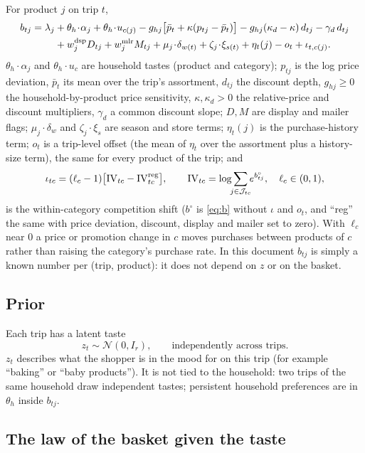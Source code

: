 \documentclass[11pt,a4paper]{article}
\theoremstyle{remark}
\newcommand{\N}{\mathcal N}
\begin{document}
For product $j$ on trip $t$,
\begin{align}
b_{tj}=\lambda_j &+\theta_h\!\cdot\!\alpha_j+\theta_h\!\cdot\!u_{c(j)}
 -g_{hj}\big[\bar p_t+\kappa(p_{tj}-\bar p_t)\big]-g_{hj}(\kappa_d-\kappa)\,d_{tj}-\gamma_d\,d_{tj}\nonumber\\
&+w^{\rm dsp}_j D_{tj}+w^{\rm mlr}_j M_{tj}+\mu_j\!\cdot\!\delta_{w(t)}+\zeta_j\!\cdot\!\xi_{s(t)}
 +\eta_t(j)-o_t+\iota_{t,c(j)} .
\label{eq:b}
\end{align}
$\theta_h\cdot\alpha_j$ and $\theta_h\cdot u_c$ are household tastes (product and category);
$p_{tj}$ is the log price deviation, $\bar p_t$ its mean over the trip's assortment, $d_{tj}$ the discount
depth, $g_{hj}\ge0$ the household-by-product price sensitivity, $\kappa,\kappa_d>0$ the relative-price and
discount multipliers, $\gamma_d$ a common discount slope; $D,M$ are display and mailer flags;
$\mu_j\cdot\delta_w$ and $\zeta_j\cdot\xi_s$ are season and store terms; $\eta_t(j)$ is the purchase-history
term; $o_t$ is a trip-level offset (the mean of $\eta_t$ over the assortment plus a history-size term), the
same for every product of the trip; and
\[
\iota_{tc}=(\ell_c-1)\big[\mathrm{IV}_{tc}-\mathrm{IV}^{\rm reg}_{tc}\big],\qquad
\mathrm{IV}_{tc}=\log\!\!\sum_{j\in\mathcal J_{tc}}\!\! e^{b^{\circ}_{tj}},\quad \ell_c\in(0,1),
\]
is the within-category competition shift ($b^\circ$ is \eqref{eq:b} without $\iota$ and $o_t$, and ``reg'' the same with
price deviation, discount, display and mailer set to zero). With $\ell_c$ near 0 a price or promotion change
in $c$ moves purchases between products of $c$ rather than raising the category's purchase rate. In
this document $b_{tj}$ is simply a known number per (trip, product): it does not depend on $z$ or on the
basket.

\subsection{Prior}

Each trip has a latent taste
\begin{equation}
z_t\sim\N(0,I_r),\qquad\text{independently across trips.}
\label{eq:prior}
\end{equation}
$z_t$ describes what the shopper is in the mood for on this trip (for example ``baking'' or ``baby
products''). It is not tied to the household: two trips of the same household draw independent tastes;
persistent household preferences are in $\theta_h$ inside $b_{tj}$.

\subsection{The law of the basket given the taste}
\end{document}
